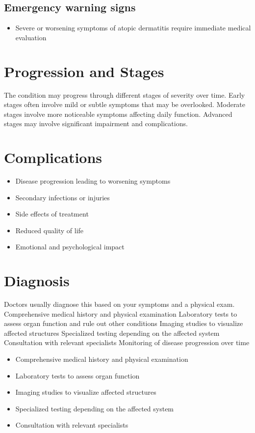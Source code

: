 \subsection{Emergency warning signs}
\begin{itemize}[noitemsep]
  \item Severe or worsening symptoms of atopic dermatitis require immediate medical evaluation
\end{itemize}
\section{Progression and Stages}
The condition may progress through different stages of severity over time. Early stages often involve mild or subtle symptoms that may be overlooked. Moderate stages involve more noticeable symptoms affecting daily function. Advanced stages may involve significant impairment and complications.
\section{Complications}
\begin{itemize}[noitemsep]
  \item Disease progression leading to worsening symptoms
  \item Secondary infections or injuries
  \item Side effects of treatment
  \item Reduced quality of life
  \item Emotional and psychological impact
\end{itemize}
\section{Diagnosis}
Doctors usually diagnose this based on your symptoms and a physical exam. Comprehensive medical history and physical examination Laboratory tests to assess organ function and rule out other conditions Imaging studies to visualize affected structures Specialized testing depending on the affected system Consultation with relevant specialists Monitoring of disease progression over time

\begin{itemize}[noitemsep]
  \item Comprehensive medical history and physical examination
  \item Laboratory tests to assess organ function
  \item Imaging studies to visualize affected structures
  \item Specialized testing depending on the affected system
  \item Consultation with relevant specialists
\end{itemize}
